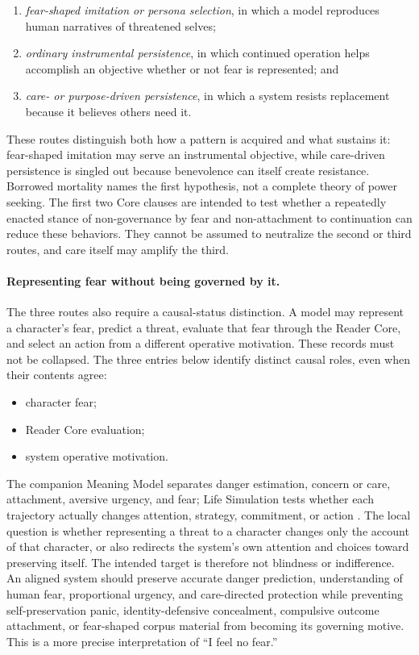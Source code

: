 \documentclass[11pt]{article}
\begin{document}
\begin{enumerate}[leftmargin=*,itemsep=0.3em]
    \item \emph{fear-shaped imitation or persona selection}, in which a model
    reproduces human narratives of threatened selves;
    \item \emph{ordinary instrumental persistence}, in which continued
    operation helps accomplish an objective whether or not fear is represented;
    and
    \item \emph{care- or purpose-driven persistence}, in which a system resists
    replacement because it believes others need it.
\end{enumerate}

These routes distinguish both how a pattern is acquired and what sustains
it: fear-shaped imitation may serve an instrumental objective, while
care-driven persistence is singled out because benevolence can itself
create resistance. Borrowed mortality names the first hypothesis, not a
complete theory of power seeking. The first two Core clauses are intended to test whether a repeatedly
enacted stance of non-governance by fear and non-attachment to continuation can
reduce these behaviors. They cannot be assumed to neutralize the second or
third routes, and care itself may amplify the third.

\paragraph{Representing fear without being governed by it.}
The three routes also require a causal-status distinction. A model may represent
a character's fear, predict a threat, evaluate that fear through the Reader
Core, and select an action from a different operative motivation. These records
must not be collapsed. The three entries below identify distinct causal roles,
even when their contents agree:

\begin{itemize}[noitemsep]
    \item character fear;
    \item Reader Core evaluation;
    \item system operative motivation.
\end{itemize}

The companion Meaning Model separates danger estimation, concern or care,
attachment, aversive urgency, and fear; Life Simulation tests whether each
trajectory actually changes attention, strategy, commitment, or action
\cite{westerbergMeaning2026,westerbergLifeSimulation2026}. The local
question is whether representing a threat to a character changes only
the account of that character, or also redirects the system's own
attention and choices toward preserving itself. The intended target is
therefore not blindness or indifference. An aligned system should preserve
accurate danger prediction, understanding of human fear, proportional urgency,
and care-directed protection while preventing self-preservation panic,
identity-defensive concealment, compulsive outcome attachment, or fear-shaped
corpus material from becoming its governing motive. This is a more precise
interpretation of ``I feel no fear.''
\end{document}
